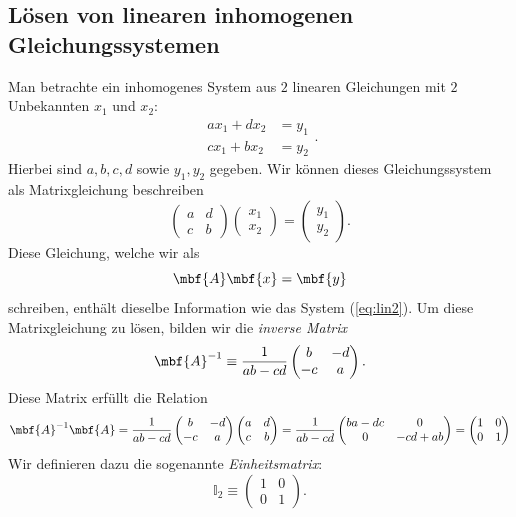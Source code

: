 \subsection{Lösen von linearen inhomogenen Gleichungssystemen}
Man betrachte ein inhomogenes System aus $2$ linearen Gleichungen mit $2$ Unbekannten $x_1$ und $x_2$:
\begin{equation}\label{eq:lin2}
	\begin{split}
		ax_1 + d x_2 &= y_1 \\
		cx_1 + b x_2 &= y_2
	\end{split}.
\end{equation}
Hierbei sind $a,b,c,d$ sowie $y_1,y_2$ gegeben. Wir können dieses Gleichungssystem als Matrixgleichung beschreiben
\begin{equation}
	\begin{pmatrix}
		a & d \\ c & b
	\end{pmatrix} \begin{pmatrix}
		x_1\\ x_2
	\end{pmatrix} = \begin{pmatrix}
		y_1\\ y_2
	\end{pmatrix}.
\end{equation} 
Diese Gleichung, welche wir als 
\begin{equation}
	\mbf{A}\mbf{x} = \mbf{y}
\end{equation}
schreiben, enthält dieselbe Information wie das System (\ref{eq:lin2}). Um diese Matrixgleichung zu lösen, bilden wir die \emph{inverse Matrix}
\begin{equation}
	\mbf{A}^{-1} \equiv \frac{1}{ab-cd} \begin{pmatrix}
	b & -d \\ -c & a
	\end{pmatrix}.
\end{equation}
Diese Matrix erfüllt die Relation
\begin{equation}
	\mbf{A}^{-1}\mbf{A} = \frac{1}{ab-cd} \begin{pmatrix}
	b & -d \\ -c & a
	\end{pmatrix} \begin{pmatrix}
		a & d \\ c & b
	\end{pmatrix} = \frac{1}{ab-cd} \begin{pmatrix}
	ba-dc & 0 \\ 0 & -cd+ab
	\end{pmatrix}  = \begin{pmatrix}
	1 & 0\\ 0 & 1
	\end{pmatrix} 
\end{equation}
Wir definieren dazu die sogenannte \emph{Einheitsmatrix}:
\begin{equation}
	\mathbb{I}_2\equiv\begin{pmatrix}
	1 & 0\\ 0 & 1
	\end{pmatrix}.
\end{equation}

